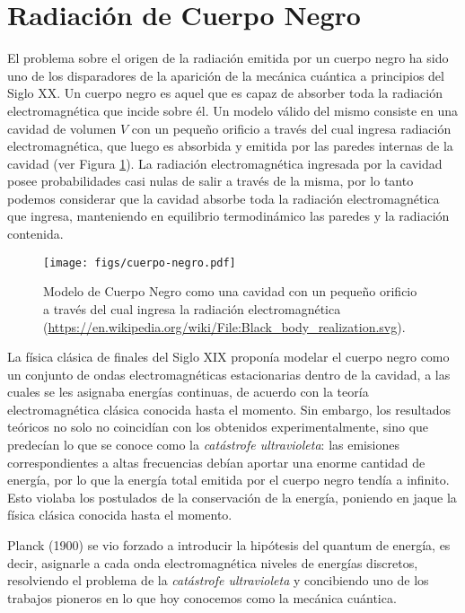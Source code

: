 \documentclass[a4paper,11pt]{article}
\begin{document}
\section{Radiación de Cuerpo Negro}

El problema sobre el origen de la radiación emitida por un cuerpo negro ha
sido uno de los disparadores de la aparición de la mecánica cuántica a
principios del Siglo XX.
Un cuerpo negro es aquel que es capaz de absorber toda la radiación
electromagnética que incide sobre él.
Un modelo válido del mismo consiste en una cavidad de volumen $V$ con un
pequeño orificio a través del cual ingresa radiación electromagnética, que
luego es absorbida y emitida por las paredes internas de la cavidad (ver
Figura \ref{fig:cuerpo-negro}).
La radiación electromagnética ingresada por la cavidad posee
probabilidades casi nulas de salir a través de la misma, por lo tanto podemos
considerar que la cavidad absorbe toda la radiación electromagnética que
ingresa, manteniendo en equilibrio termodinámico las paredes y la radiación
contenida.

\begin{figure}[b!]
\centering
\texttt{[image: figs/cuerpo-negro.pdf]}
\caption{Modelo de Cuerpo Negro como una cavidad con un pequeño orificio a
         través del cual ingresa la radiación electromagnética
         (\url{https://en.wikipedia.org/wiki/File:Black_body_realization.svg}).
         }
\label{fig:cuerpo-negro}
\end{figure}

La física clásica de finales del Siglo XIX proponía modelar el cuerpo negro
como un conjunto de ondas electromagnéticas estacionarias dentro de la
cavidad, a las cuales se les asignaba energías continuas, de acuerdo con la
teoría electromagnética clásica conocida hasta el momento.
Sin embargo, los resultados teóricos no solo no coincidían con los
obtenidos experimentalmente, sino que predecían lo que se conoce como la
\emph{catástrofe ultravioleta}: las emisiones correspondientes a altas
frecuencias debían aportar una enorme cantidad de energía, por lo que la
energía total emitida por el cuerpo negro tendía a infinito.
Esto violaba los postulados de la conservación de la energía, poniendo en
jaque la física clásica conocida hasta el momento.

Planck (1900) se vio forzado a introducir la hipótesis del quantum de
energía, es decir, asignarle a cada onda electromagnética niveles de
energías discretos, resolviendo el problema de la \emph{catástrofe
ultravioleta} y concibiendo uno de los trabajos pioneros en lo que hoy
conocemos como la mecánica cuántica.
\end{document}
